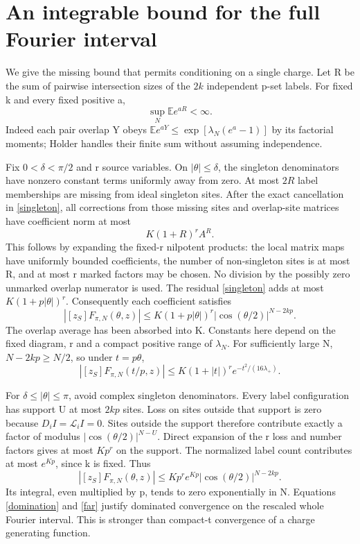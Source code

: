 \documentclass[11pt]{article}
\newcommand{\E}{\mathbb E}
\begin{document}
\newpage
\section{An integrable bound for the full Fourier interval}
We give the missing bound that permits conditioning on a single charge.
Let R be the sum of pairwise intersection sizes of the $2k$ independent
p-set labels. For fixed k and every fixed positive a,
\[
 \sup_N\E e^{aR}<\infty.
\]
Indeed each pair overlap Y obeys
$\E e^{aY}\le\exp[\lambda_N(e^a-1)]$ by its factorial moments;
Holder handles their finite sum without assuming independence.

Fix $0<\delta<\pi/2$ and r source variables. On $|\theta|\le\delta$,
the singleton denominators have nonzero constant terms uniformly away
from zero. At most $2R$ label memberships are missing from ideal
singleton sites. After the exact cancellation in \eqref{singleton},
all corrections from those missing sites and overlap-site matrices
have coefficient norm at most
\[
 K(1+R)^r A^R.
\]
This follows by expanding the fixed-r nilpotent products: the local
matrix maps have uniformly bounded coefficients, the number of
non-singleton sites is at most R, and at most r marked factors may be
chosen. No division by the possibly zero unmarked overlap numerator
is used. The residual \eqref{singleton} adds at most
$K(1+p|\theta|)^r$. Consequently each coefficient satisfies
\begin{equation}
 |[z_S]F_{\pi,N}(\theta,z)|
 \le K(1+p|\theta|)^r|\cos(\theta/2)|^{N-2kp}.
 \label{near}
\end{equation}
The overlap average has been absorbed into K. Constants here depend on
the fixed diagram, r and a compact positive range of $\lambda_N$.
For sufficiently large N, $N-2kp\ge N/2$, so under $t=p\theta$,
\begin{equation}
 |[z_S]F_{\pi,N}(t/p,z)|
 \le K(1+|t|)^r e^{-t^2/(16\lambda_+)}.
 \label{domination}
\end{equation}

For $\delta\le|\theta|\le\pi$, avoid complex singleton denominators.
Every label configuration has support U at most $2kp$ sites. Loss
on sites outside that support is zero because $D_iI=\mathcal L_iI=0$.
Sites outside the support therefore contribute exactly a factor
of modulus $|\cos(\theta/2)|^{N-U}$. Direct expansion of the r loss
and number factors gives at most $Kp^r$ on the support. The normalized
label count contributes at most $e^{Kp}$, since k is fixed. Thus
\begin{equation}
 |[z_S]F_{\pi,N}(\theta,z)|
 \le Kp^r e^{Kp}|\cos(\theta/2)|^{N-2kp}.
 \label{far}
\end{equation}
Its integral, even multiplied by p, tends to zero exponentially in N.
Equations \eqref{domination} and \eqref{far} justify dominated
convergence on the rescaled whole Fourier interval. This is stronger
than compact-t convergence of a charge generating function.
\end{document}

